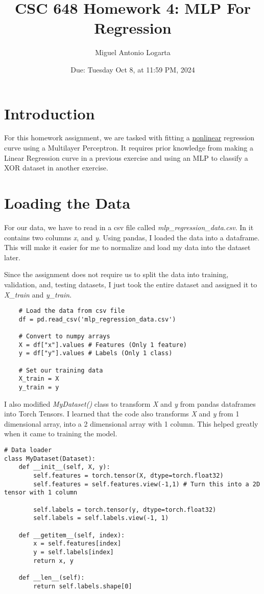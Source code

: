 \documentclass{article}
\title{CSC 648 Homework 4: MLP For Regression}
\date{Due: Tuesday Oct 8, at 11:59 PM, 2024}
\author{Miguel Antonio Logarta}
\begin{document}
\maketitle  %
\thispagestyle{fancy}

\section{Introduction}
For this homework assignment, we are tasked with fitting a \underline{nonlinear} regression curve using a Multilayer Perceptron. It requires prior knowledge from making a Linear Regression curve in a previous exercise and using an MLP to classify a XOR dataset in another exercise. 
\section{Loading the Data}
For our data, we have to read in a csv file called \textit{mlp\_regression\_data.csv}. In it contains two columns \textit{x}, and \textit{y}. Using pandas, I loaded the data into a dataframe. This will make it easier for me to normalize and load my data into the dataset later. 

Since the assignment does not require us to split the data into training, validation, and, testing datasets, I just took the entire dataset and assigned it to \textit{X\_train} and \textit{y\_train}.

\begin{lstlisting}
    # Load the data from csv file
    df = pd.read_csv('mlp_regression_data.csv')

    # Convert to numpy arrays
    X = df["x"].values # Features (Only 1 feature)
    y = df["y"].values # Labels (Only 1 class)

    # Set our training data
    X_train = X
    y_train = y
\end{lstlisting}

I also modified \textit{MyDataset()} class to transform \textit{X} and \textit{y} from pandas dataframes into Torch Tensors. I learned that the code also transforms \textit{X} and \textit{y} from 1 dimensional array, into a 2 dimensional array with 1 column. This helped greatly when it came to training the model.

\begin{lstlisting}
# Data loader
class MyDataset(Dataset):
    def __init__(self, X, y):
        self.features = torch.tensor(X, dtype=torch.float32)
        self.features = self.features.view(-1,1) # Turn this into a 2D tensor with 1 column

        self.labels = torch.tensor(y, dtype=torch.float32)
        self.labels = self.labels.view(-1, 1)

    def __getitem__(self, index):
        x = self.features[index]
        y = self.labels[index]        
        return x, y

    def __len__(self):
        return self.labels.shape[0]
\end{lstlisting}
\end{document}
